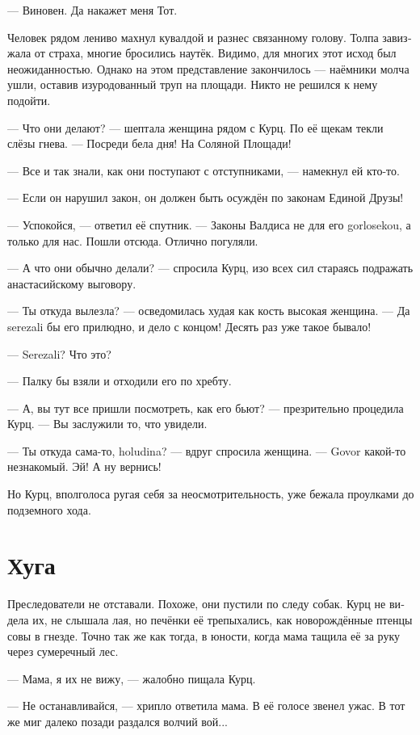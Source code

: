 \documentclass[a4paper,12pt,fleqn]{book}\usepackage{cooltooltips}\usepackage{polyglossia}\setdefaultlanguage[babelshorthands=true]{russian}\setotherlanguage{english}\defaultfontfeatures{Ligatures=TeX,Mapping=tex-text} \usepackage{xcolor}\definecolor{lightgray}{HTML}{bbbbbb}\color{lightgray}\newcommand{\ml}[3]{\textenglish{\textcolor{black}{#3}}}
\begin{document}
--- Виновен.
Да накажет меня Тот.

Человек рядом лениво махнул кувалдой и разнес связанному голову.
Толпа завизжала от страха, многие бросились наутёк.
Видимо, для многих этот исход был неожиданностью.
Однако на этом представление закончилось --- наёмники молча ушли, оставив изуродованный труп на площади.
Никто не решился к нему подойти.

--- Что они делают? --- шептала женщина рядом с Курц.
По её щекам текли слёзы гнева.
--- Посреди бела дня!
На Соляной Площади!

--- Все и так знали, как они поступают с отступниками, --- намекнул ей кто-то.

--- Если он нарушил закон, он должен быть осуждён по законам Единой Друзы!

--- Успокойся, --- ответил её спутник.
--- Законы Валдиса не для его gorlosekou, а только для нас.
Пошли отсюда.
Отлично погуляли.

--- А что они обычно делали? --- спросила Курц, изо всех сил стараясь подражать анастасийскому выговору.

--- Ты откуда вылезла? --- осведомилась худая как кость высокая женщина.
--- Да serezali бы его прилюдно, и дело с концом!
Десять раз уже такое бывало!

--- Serezali?
Что это?

--- Палку бы взяли и отходили его по хребту.

--- А, вы тут все пришли посмотреть, как его бьют? --- презрительно процедила Курц.
--- Вы заслужили то, что увидели.

--- Ты откуда сама-то, holudina? --- вдруг спросила женщина.
--- Govor какой-то незнакомый.
Эй!
А ну вернись!

Но Курц, вполголоса ругая себя за неосмотрительность, уже бежала проулками до подземного хода.

\section{Хуга}

Преследователи не отставали.
Похоже, они пустили по следу собак.
Курц не видела их, не слышала лая, но печёнки её трепыхались, как новорождённые птенцы совы в гнезде.
Точно так же как тогда, в юности, когда мама тащила её за руку через сумеречный лес.

--- Мама, я их не вижу, --- жалобно пищала Курц.

--- Не останавливайся, --- хрипло ответила мама.
В её голосе звенел ужас.
В тот же миг далеко позади раздался волчий вой...
\end{document}
